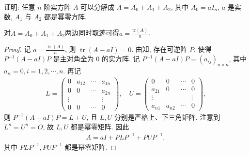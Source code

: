 \documentclass[../../main.tex]{subfiles}%
\begin{document}
\begin{example}
证明: 任意 $n$ 阶实方阵 $A$ 可以分解成 $A=A_0+A_1+A_2$, 其中 $A_0=aI_n$, $a$ 是实数, $A_1$ 与 $A_2$ 都是幂零方阵.
\end{example}
\begin{remark}
对$A=A_0+A_1+A_2$两边同时取迹可得$a=\frac{\mathrm{tr}(A)}{n}$.
\end{remark}
\begin{proof}
记 $a=\frac{\operatorname{tr}(A)}{n}$, 则 $\operatorname{tr}(A-aI)=0$. 由知, 存在可逆阵 $P$, 使得 $P^{-1}(A-aI)P$ 是主对角全为 $0$ 的实方阵.
记 $P^{-1}(A-aI)P=(a_{ij})_{n\times n}$, 其中 $a_{ii}=0,i=1,2,\cdots,n$. 再记
\begin{align*}
L=\begin{pmatrix}
0 & a_{12} & \cdots & a_{1n} \\
0 & 0 & \cdots & a_{2n} \\
\vdots & & & \vdots \\
0 & 0 & \cdots & 0
\end{pmatrix},\quad U=\begin{pmatrix}
0 & 0 & \cdots & 0 \\
a_{21} & 0 & \cdots & 0 \\
\vdots & & & \vdots \\
a_{n1} & a_{n2} & \cdots & 0
\end{pmatrix},
\end{align*}
则 $P^{-1}(A-aI)P=L+U$, 且 $L,U$ 分别是严格上、下三角矩阵. 注意到 $L^n=U^n=O$, 故 $L,U$ 都是幂零矩阵. 因此
\begin{align*}
A=aI+PLP^{-1}+PUP^{-1},
\end{align*}
其中 $PLP^{-1},PUP^{-1}$ 都是幂零矩阵.
\end{proof}
\end{document}
